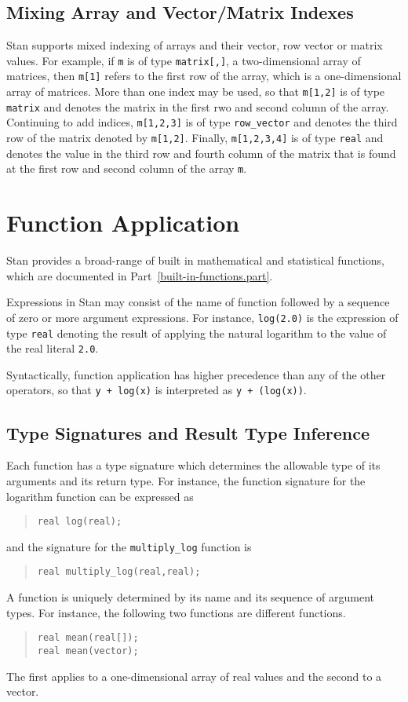 \documentclass[10pt]{report}
\newcommand{\Stan}{Stan\xspace}
\newcommand{\code}[1]{{\tt #1}}
\newcommand{\refpart}[1]{Part~\ref{#1.part}}
\begin{document}
\subsection{Mixing Array and Vector/Matrix Indexes}

\Stan supports mixed indexing of arrays and their vector, row vector
or matrix values.  For example, if \code{m} is of type
\code{matrix[,]}, a two-dimensional array of matrices, then
\code{m[1]} refers to the first row of the array, which is a
one-dimensional array of matrices.  More than one index may be used,
so that \code{m[1,2]} is of type \code{matrix} and denotes the matrix
in the first rwo and second column of the array.  Continuing to add
indices, \code{m[1,2,3]} is of type \code{row\_vector} and denotes
the third row of the matrix denoted by \code{m[1,2]}.  Finally,
\code{m[1,2,3,4]} is of type \code{real} and denotes the value in the
third row and fourth column of the matrix that is found at the first
row and second column of the array \code{m}.

\section{Function Application}

\Stan provides a broad-range of built in mathematical and statistical
functions, which are documented in \refpart{built-in-functions}.

Expressions in \Stan may consist of the name of function followed by a
sequence of zero or more argument expressions.  For instance,
\code{log(2.0)} is the expression of type \code{real} denoting the
result of applying the natural logarithm to the value of the real
literal \code{2.0}.

Syntactically, function application has higher precedence than any of
the other operators, so that \code{y + log(x)} is interpreted as
\code{y + (log(x))}.

\subsection{Type Signatures and Result Type Inference}

Each function has a type signature which determines the allowable type
of its arguments and its return type.  For instance, the function
signature for the logarithm function can be expressed as
%
\begin{quote}
\code{real log(real);}
\end{quote}
%
and the signature for the \code{multiply\_log} function is
%
\begin{quote}
\code{real multiply\_log(real,real);}
\end{quote}
%
A function is uniquely determined by its name and its sequence of
argument types.  For instance, the following two functions are
different functions.
%
\begin{quote}
\code{real mean(real[]);}
\\
\code{real mean(vector);}
\end{quote}
%
The first applies to a one-dimensional array of real values and the
second to a vector.
\end{document}
